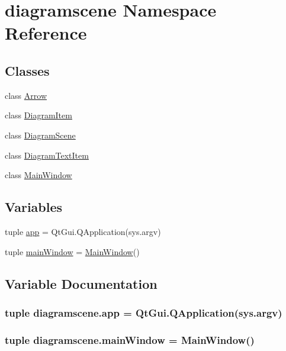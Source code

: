 \hypertarget{namespacediagramscene}{}\section{diagramscene Namespace Reference}
\label{namespacediagramscene}
\subsection*{Classes}
\begin{DoxyCompactItemize}
\item 
class \hyperlink{classdiagramscene_1_1Arrow}{Arrow}
\item 
class \hyperlink{classdiagramscene_1_1DiagramItem}{Diagram\+Item}
\item 
class \hyperlink{classdiagramscene_1_1DiagramScene}{Diagram\+Scene}
\item 
class \hyperlink{classdiagramscene_1_1DiagramTextItem}{Diagram\+Text\+Item}
\item 
class \hyperlink{classdiagramscene_1_1MainWindow}{Main\+Window}
\end{DoxyCompactItemize}
\subsection*{Variables}
\begin{DoxyCompactItemize}
\item 
tuple \hyperlink{namespacediagramscene_a0d99afd2c3b147087b5c18f999724dd2}{app} = Qt\+Gui.\+Q\+Application(sys.\+argv)
\item 
tuple \hyperlink{namespacediagramscene_a77e6206ed4c4e3b3e51aaa30d72ef5d2}{main\+Window} = \hyperlink{classdiagramscene_1_1MainWindow}{Main\+Window}()
\end{DoxyCompactItemize}


\subsection{Variable Documentation}
\hypertarget{namespacediagramscene_a0d99afd2c3b147087b5c18f999724dd2}{}
\subsubsection[{app}]{\setlength{\rightskip}{0pt plus 5cm}tuple diagramscene.\+app = Qt\+Gui.\+Q\+Application(sys.\+argv)}\label{namespacediagramscene_a0d99afd2c3b147087b5c18f999724dd2}
\hypertarget{namespacediagramscene_a77e6206ed4c4e3b3e51aaa30d72ef5d2}{}
\subsubsection[{main\+Window}]{\setlength{\rightskip}{0pt plus 5cm}tuple diagramscene.\+main\+Window = {\bf Main\+Window}()}\label{namespacediagramscene_a77e6206ed4c4e3b3e51aaa30d72ef5d2}
